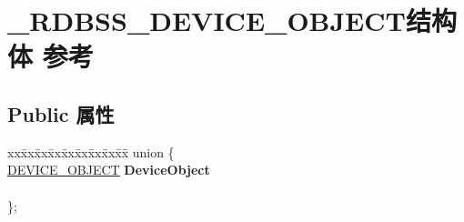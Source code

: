 \hypertarget{struct___r_d_b_s_s___d_e_v_i_c_e___o_b_j_e_c_t}{}\section{\+\_\+\+R\+D\+B\+S\+S\+\_\+\+D\+E\+V\+I\+C\+E\+\_\+\+O\+B\+J\+E\+C\+T结构体 参考}
\label{struct___r_d_b_s_s___d_e_v_i_c_e___o_b_j_e_c_t}
\subsection*{Public 属性}
\begin{DoxyCompactItemize}
\item 
\mbox{\label{struct___r_d_b_s_s___d_e_v_i_c_e___o_b_j_e_c_t_a640507b844e3330db5a0583b03bf19bf}} 
\begin{tabbing}
xx\=xx\=xx\=xx\=xx\=xx\=xx\=xx\=xx\=\kill
union \{\\
\>\hyperlink{struct___d_e_v_i_c_e___o_b_j_e_c_t}{DEVICE\_OBJECT} {\bfseries DeviceObject}\\
\\
\}; \\


\end{tabbing}
\end{DoxyCompactItemize}
